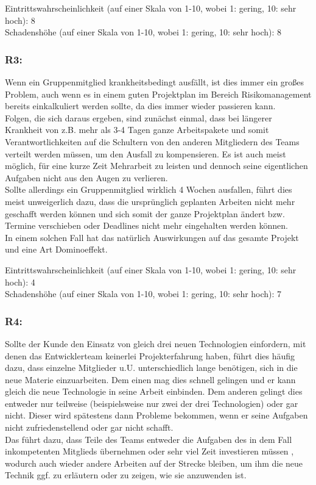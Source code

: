 \documentclass{swp1}
\begin{document}
Eintrittswahrscheinlichkeit (auf einer Skala von 1-10, wobei 1: gering, 10: sehr hoch): 8 \\
Schadenshöhe (auf einer Skala von 1-10, wobei 1: gering, 10: sehr hoch): 8

\subsubsection*{R3:}
Wenn ein Gruppenmitglied krankheitsbedingt ausfällt, ist dies immer ein großes Problem, auch wenn es in einem guten Projektplan im Bereich  Risikomanagement bereits einkalkuliert werden sollte, da dies immer wieder passieren kann. \\
Folgen, die sich daraus ergeben, sind zunächst einmal, dass bei längerer Krankheit von z.B. mehr als 3-4 Tagen ganze Arbeitspakete und somit Verantwortlichkeiten auf die Schultern von den anderen Mitgliedern des Teams verteilt werden müssen, um den Ausfall zu kompensieren. Es ist auch meist möglich, für eine kurze Zeit Mehrarbeit zu leisten und dennoch seine eigentlichen Aufgaben nicht aus den Augen zu verlieren. \\
Sollte allerdings ein Gruppenmitglied wirklich 4 Wochen ausfallen, führt dies meist unweigerlich dazu, dass die ursprünglich geplanten Arbeiten nicht mehr geschafft werden können und sich somit der ganze Projektplan ändert bzw. Termine verschieben oder Deadlines nicht mehr eingehalten werden können.\\
In einem solchen Fall hat das natürlich Auswirkungen auf das gesamte Projekt und eine Art Dominoeffekt.

Eintrittswahrscheinlichkeit (auf einer Skala von 1-10, wobei 1: gering, 10: sehr hoch): 4 \\
Schadenshöhe (auf einer Skala von 1-10, wobei 1: gering, 10: sehr hoch): 7

\subsubsection*{R4:}
Sollte der Kunde den Einsatz von gleich drei neuen Technologien einfordern, mit denen das Entwicklerteam keinerlei Projekterfahrung haben, führt dies häufig dazu, dass einzelne Mitglieder u.U. unterschiedlich lange benötigen, sich in die neue Materie einzuarbeiten. Dem einen mag dies schnell gelingen und er kann gleich die neue Technologie in seine Arbeit einbinden. Dem anderen gelingt dies entweder nur teilweise (beispielsweise nur zwei der drei Technologien) oder gar nicht. Dieser wird spätestens dann Probleme bekommen, wenn er seine Aufgaben nicht zufriedenstellend oder gar nicht schafft. \\
Das führt dazu, dass Teile des Teams entweder die Aufgaben des in dem Fall inkompetenten Mitglieds übernehmen oder sehr viel Zeit investieren müssen , wodurch auch wieder andere Arbeiten auf der Strecke bleiben, um ihm die neue Technik ggf. zu erläutern oder zu zeigen, wie sie anzuwenden ist.\\
\end{document}
